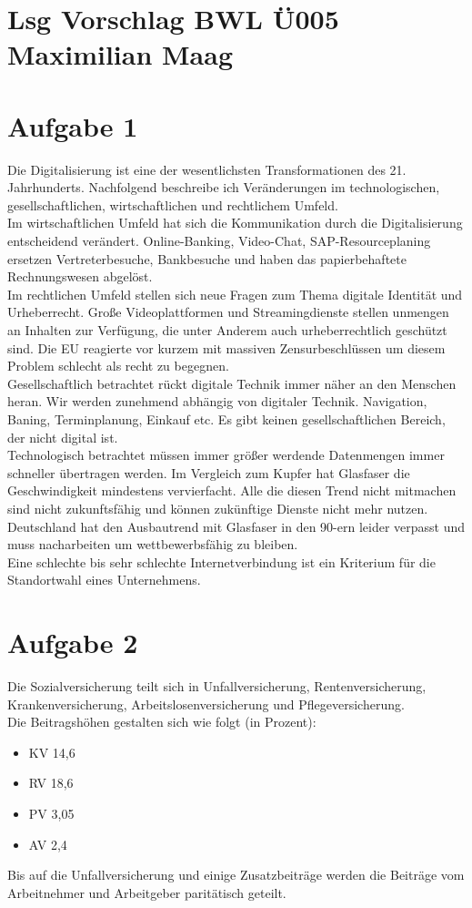 \documentclass{article}
\begin{document}
	\section*{Lsg Vorschlag BWL Ü005 Maximilian Maag}
	\section*{Aufgabe 1}
	Die Digitalisierung ist eine der wesentlichsten Transformationen des 21. Jahrhunderts. Nachfolgend beschreibe ich Veränderungen im technologischen, gesellschaftlichen, wirtschaftlichen und rechtlichem Umfeld. \\
	Im wirtschaftlichen Umfeld hat sich die Kommunikation durch die Digitalisierung entscheidend verändert. Online-Banking, Video-Chat, SAP-Resourceplaning ersetzen Vertreterbesuche, Bankbesuche und haben das papierbehaftete Rechnungswesen abgelöst. \\
	Im rechtlichen Umfeld stellen sich neue Fragen zum Thema digitale Identität und Urheberrecht. Große Videoplattformen und Streamingdienste stellen unmengen an Inhalten zur Verfügung, die unter Anderem auch urheberrechtlich geschützt sind. Die EU reagierte vor kurzem mit massiven Zensurbeschlüssen um diesem Problem schlecht als recht zu begegnen. \\
	Gesellschaftlich betrachtet rückt digitale Technik immer näher an den Menschen heran. Wir werden zunehmend abhängig von digitaler Technik. Navigation, Baning, Terminplanung, Einkauf etc. Es gibt keinen gesellschaftlichen Bereich, der nicht digital ist. \\
	Technologisch betrachtet müssen immer größer werdende Datenmengen immer schneller übertragen werden. Im Vergleich zum Kupfer hat Glasfaser die Geschwindigkeit mindestens vervierfacht. Alle die diesen Trend nicht mitmachen sind nicht zukunftsfähig und können zukünftige Dienste nicht mehr nutzen. Deutschland hat den Ausbautrend mit Glasfaser in den 90-ern leider verpasst und muss nacharbeiten um wettbewerbsfähig zu bleiben. \\
	Eine schlechte bis sehr schlechte Internetverbindung ist ein Kriterium für die Standortwahl eines Unternehmens.
	\section*{Aufgabe 2}
	Die Sozialversicherung teilt sich in Unfallversicherung, Rentenversicherung, Krankenversicherung, Arbeitslosenversicherung und Pflegeversicherung. \\
	Die Beitragshöhen gestalten sich wie folgt (in Prozent): \\
	\begin{itemize}
		\item KV 14,6 
		\item RV 18,6 
		\item PV 3,05
		\item AV 2,4
	\end{itemize}
Bis auf die Unfallversicherung und einige Zusatzbeiträge werden die Beiträge vom Arbeitnehmer und Arbeitgeber paritätisch geteilt.
		
\end{document}
